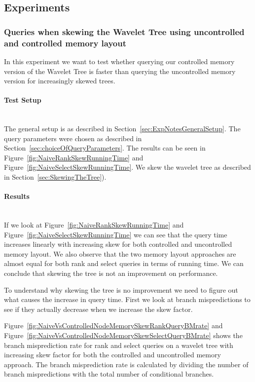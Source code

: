 \subsection{Experiments}

\subsubsection{Queries when skewing the Wavelet Tree using uncontrolled and controlled memory layout}
In this experiment we want to test whether querying our controlled memory version of the Wavelet Tree is faster than querying the uncontrolled memory version for increasingly skewed trees. 

\paragraph{Test Setup}~\\
The general setup is as described in Section~\ref{sec:ExpNotesGeneralSetup}.
The query parameters were chosen as described in Section~\ref{sec:choiceOfQueryParameters}.
The results can be seen in Figure~\ref{fig:NaiveRankSkewRunningTime} and Figure~\ref{fig:NaiveSelectSkewRunningTime}.
We skew the wavelet tree as described in Section~\ref{sec:SkewingTheTree}).

\paragraph{Results}~\\
If we look at Figure~\ref{fig:NaiveRankSkewRunningTime} and Figure~\ref{fig:NaiveSelectSkewRunningTime} we can see that the query time increases linearly with increasing skew for both controlled and uncontrolled memory layout. We also observe that the two memory layout approaches are almost equal for both rank and select queries in terms of running time.
We can conclude that skewing the tree is not an improvement on performance.

To understand why skewing the tree is no improvement we need to figure out what causes the increase in query time. 
First we look at branch mispredictions to see if they actually decrease when we increase the skew factor.%

 
Figure~\ref{fig:NaiveVsControlledNodeMemorySkewRankQueryBMrate} and Figure~\ref{fig:NaiveVsControlledNodeMemorySkewSelectQueryBMrate} shows the branch misprediction rate for rank and select queries on a wavelet tree with increasing skew factor for both the controlled and uncontrolled memory approach. 
The branch misprediction rate is calculated by dividing the number of branch mispredictions with the total number of conditional branches.

